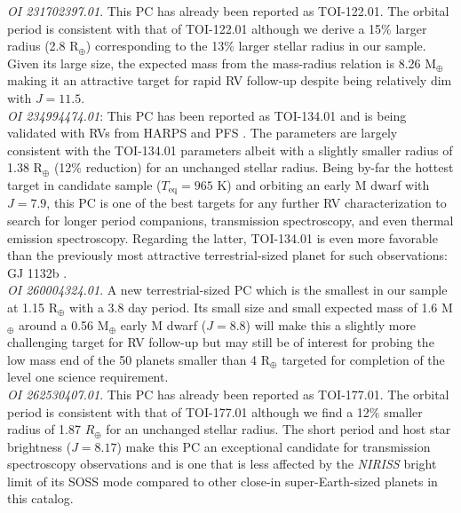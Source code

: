 \emph{OI 231702397.01}. This PC has already been reported as TOI-122.01. The \pipeline{} orbital
period is consistent with that of TOI-122.01 although we derive a 15\% larger radius (2.8 R$_{\oplus}$)
corresponding to the 13\% larger stellar radius in our sample. Given its large size, the expected
mass from the \cite{chen17} mass-radius relation is 8.26 M$_{\oplus}$ making it an attractive target
for rapid RV follow-up despite being relatively dim with $J=11.5$. \\

\emph{OI 234994474.01}: This PC has been reported as TOI-134.01 and is being validated with RVs
from HARPS and PFS \citep{astudillodefru19}. The \pipeline{} parameters are largely consistent with the TOI-134.01
parameters albeit with a slightly smaller radius of 1.38 R$_{\oplus}$ (12\% reduction) for
an unchanged stellar radius. Being by-far the hottest target in candidate sample ($T_{\text{eq}}=965$ K)
and orbiting an early M dwarf with $J=7.9$, this PC is one of the best targets for any further RV
characterization to search for longer period companions, transmission spectroscopy, and even thermal
emission spectroscopy. Regarding the latter, TOI-134.01
is even more favorable than the previously most attractive
terrestrial-sized planet for such observations: GJ 1132b \citep{morley17}. \\

\emph{OI 260004324.01}. A new terrestrial-sized PC which is the smallest in our sample
at 1.15 R$_{\oplus}$ with a 3.8 day period. Its small size and small expected mass of 1.6 M$_{\oplus}$
around a 0.56 M$_{\oplus}$ early M dwarf ($J=8.8$) will make this a slightly more challenging target
for RV follow-up but may still be of interest for probing the low mass end of the 50 planets
smaller than 4 R$_{\oplus}$ targeted for completion of the \tess{} level one science requirement. \\

\emph{OI 262530407.01}. This PC has already been reported as TOI-177.01. The \pipeline{} orbital
period is consistent with that of TOI-177.01 although we find a 12\% smaller radius of 1.87
$R_{\oplus}$ for an unchanged stellar radius. The short period and host star brightness ($J=8.17$)
make this PC an exceptional candidate for transmission spectroscopy observations and is one
that is less affected by the \emph{NIRISS} bright limit of its SOSS mode compared to other
close-in super-Earth-sized planets in this catalog. \\

